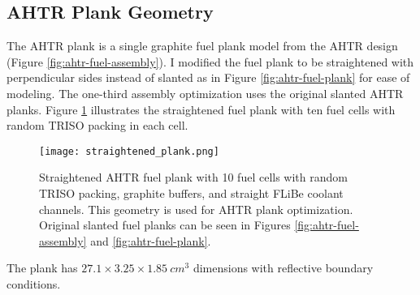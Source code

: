 \subsection{AHTR Plank Geometry}
\label{sec:ahtr-plank-geometry}
The \gls{AHTR} plank is a single graphite fuel plank model from the \gls{AHTR} design 
(Figure \ref{fig:ahtr-fuel-assembly}). 
I modified the fuel plank to be straightened with perpendicular sides instead 
of slanted as in Figure \ref{fig:ahtr-fuel-plank} for ease of modeling. 
The one-third assembly optimization uses the original slanted \gls{AHTR} planks. 
Figure \ref{fig:straightened_plank} illustrates the straightened fuel plank with 
ten fuel cells with random \gls{TRISO} packing in each cell.
\begin{figure}[htbp]
    \centering
    \texttt{[image: straightened\_plank.png]}
    \raggedright
    \caption{Straightened \acrfull{AHTR} fuel plank with 10 fuel cells with random 
    TRISO packing, graphite buffers, and straight \gls{FLiBe} coolant channels. 
    This geometry is used for \gls{AHTR} plank optimization. 
    Original slanted fuel planks can be seen in Figures 
    \ref{fig:ahtr-fuel-assembly} and \ref{fig:ahtr-fuel-plank}.}
    \label{fig:straightened_plank}
\end{figure}
The plank has $27.1 \times 3.25 \times 1.85\ cm^3$ dimensions with reflective 
boundary conditions.

